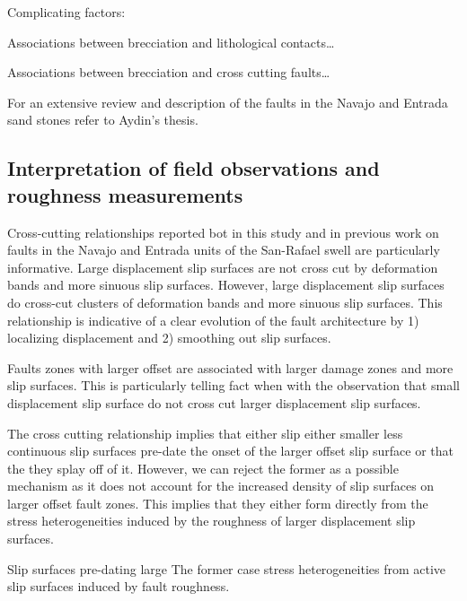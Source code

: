 \documentclass[12pt,a4paper]{article}
\begin{document}
Complicating factors:

Associations between brecciation and lithological contacts…

Associations between brecciation and cross cutting faults…

For an extensive review and description of the faults in the Navajo and Entrada sand stones refer to Aydin’s thesis. 


\subsection{Interpretation of field observations and roughness measurements}

Cross-cutting relationships reported bot in this study and in previous work on faults in the Navajo and Entrada units of the San-Rafael swell are particularly informative. Large displacement slip surfaces are not cross cut by deformation bands and more sinuous slip surfaces. However, large displacement slip surfaces do cross-cut clusters of deformation bands and more sinuous slip surfaces. This relationship is indicative of a clear evolution of the fault architecture by 1) localizing displacement and 2) smoothing out slip surfaces. 

Faults zones with larger offset are associated with larger damage zones and more slip surfaces. This is particularly telling fact when with the observation that small displacement slip surface do not cross cut larger displacement slip surfaces. 

The cross cutting relationship implies that either slip either smaller less continuous slip surfaces pre-date the onset of the larger offset slip surface or that the they splay off of it. However, we can reject the former as a possible mechanism as it does not account for the increased density of slip surfaces on larger offset fault zones.  This implies that they either form directly from the stress heterogeneities induced by the roughness of larger displacement slip surfaces. 

Slip surfaces pre-dating large The former case  stress heterogeneities from active slip surfaces induced by fault roughness.

\end{document}
